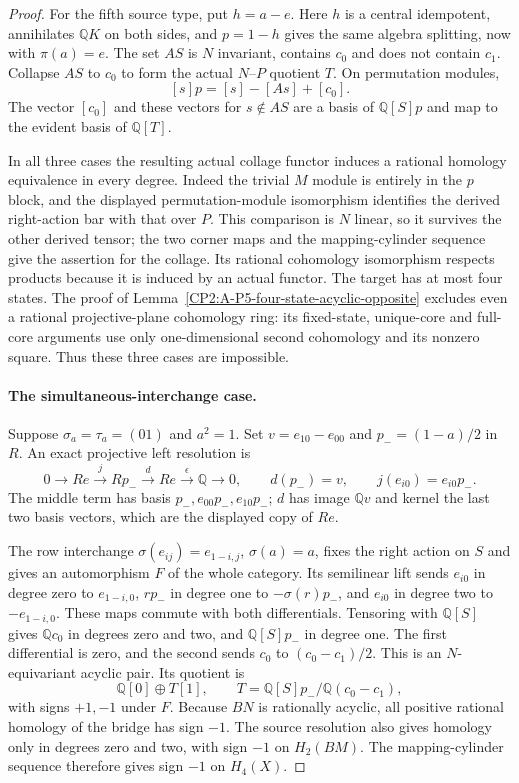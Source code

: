 \begin{proof}
For the fifth source type, put $h=a-e$. Here $h$ is a
central idempotent, annihilates $\mathbb QK$ on both sides,
and $p=1-h$ gives the same algebra splitting, now with
$\pi(a)=e$. The set $AS$ is $N$ invariant, contains $c_0$
and does not contain $c_1$. Collapse $AS$ to $c_0$ to form
the actual $N$--$P$ quotient $T$. On permutation modules,
\[
 [s]p=[s]-[As]+[c_0].
\]
The vector $[c_0]$ and these vectors for $s\notin AS$
are a basis of $\mathbb Q[S]p$ and map to the evident
basis of $\mathbb Q[T]$.

In all three cases the resulting actual collage functor
induces a rational homology equivalence in every degree.
Indeed the trivial $M$ module is entirely in the $p$
block, and the displayed permutation-module isomorphism
identifies the derived right-action bar with that over
$P$. This comparison is $N$ linear, so it survives the
other derived tensor; the two corner maps and the
mapping-cylinder sequence give the assertion for the
collage. Its rational cohomology isomorphism respects
products because it is induced by an actual functor.
The target has at most four states. The proof of
Lemma~\ref{CP2:A-P5-four-state-acyclic-opposite} excludes
even a rational projective-plane cohomology ring: its
fixed-state, unique-core and full-core arguments use only
one-dimensional second cohomology and its nonzero square.
Thus these three cases are impossible.

\paragraph{The simultaneous-interchange case.}
Suppose $\sigma_a=\tau_a=(01)$ and $a^2=1$.
Set $v=e_{10}-e_{00}$ and $p_-=(1-a)/2$ in $R$.
An exact projective left resolution is
\[
 0\longrightarrow Re\xrightarrow{j}Rp_-
 \xrightarrow{d}Re\xrightarrow{\epsilon}\mathbb Q
 \longrightarrow0,
 \qquad d(p_-)=v,\qquad j(e_{i0})=e_{i0}p_-.
\]
The middle term has basis $p_-,e_{00}p_-,e_{10}p_-$;
$d$ has image $\mathbb Qv$ and kernel the last two
basis vectors, which are the displayed copy of $Re$.

The row interchange $\sigma(e_{ij})=e_{1-i,j}$,
$\sigma(a)=a$, fixes the right action on $S$ and gives
an automorphism $F$ of the whole category. Its semilinear
lift sends $e_{i0}$ in degree zero to $e_{1-i,0}$,
$rp_-$ in degree one to $-\sigma(r)p_-$, and $e_{i0}$
in degree two to $-e_{1-i,0}$. These maps commute with
both differentials. Tensoring with $\mathbb Q[S]$ gives
$\mathbb Qc_0$ in degrees zero and two, and
$\mathbb Q[S]p_-$ in degree one. The first differential
is zero, and the second sends $c_0$ to
$(c_0-c_1)/2$. This is an $N$-equivariant acyclic pair.
Its quotient is
\[
 \mathbb Q[0]\oplus T[1],
 \qquad T=\mathbb Q[S]p_-/\mathbb Q(c_0-c_1),
\]
with signs $+1,-1$ under $F$. Because $BN$ is rationally
acyclic, all positive rational homology of the bridge has
sign $-1$. The source resolution also gives homology only
in degrees zero and two, with sign $-1$ on $H_2(BM)$.
The mapping-cylinder sequence therefore gives sign $-1$
on $H_4(X)$.


\end{proof}
